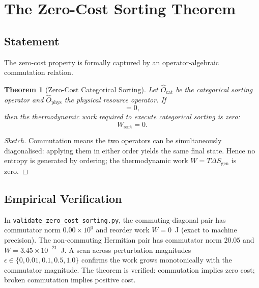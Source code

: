 \documentclass[twocolumn,11pt,a4paper]{article}
\newtheorem{theorem}{Theorem}[section]
\newcommand{\Ocat}{\hat{O}_{\mathrm{cat}}}
\newcommand{\Ophys}{\hat{O}_{\mathrm{phys}}}
\begin{document}
\section{The Zero-Cost Sorting Theorem}
\label{sec:zero_cost}

\subsection{Statement}

The zero-cost property is formally captured by an operator-algebraic commutation relation.

\begin{theorem}[Zero-Cost Categorical Sorting]
\label{thm:zero_cost}
Let $\Ocat$ be the categorical sorting operator and $\Ophys$ the physical resource operator. If
\begin{equation}
[\Ocat, \Ophys] = 0,
\end{equation}
then the thermodynamic work required to execute categorical sorting is zero:
\begin{equation}
W_{\text{sort}} = 0.
\end{equation}
\end{theorem}

\begin{proof}[Sketch]
Commutation means the two operators can be simultaneously diagonalised: applying them in either order yields the same final state. Hence no entropy is generated by ordering; the thermodynamic work $W = T \Delta S_{\text{gen}}$ is zero.
\end{proof}

\subsection{Empirical Verification}

In \texttt{validate\_zero\_cost\_sorting.py}, the commuting-diagonal pair has commutator norm $0.00 \times 10^0$ and reorder work $W = 0$~J (exact to machine precision). The non-commuting Hermitian pair has commutator norm $20.05$ and $W = 3.45 \times 10^{-21}$~J. A scan across perturbation magnitudes $\epsilon \in \{0, 0.01, 0.1, 0.5, 1.0\}$ confirms the work grows monotonically with the commutator magnitude. The theorem is verified: commutation implies zero cost; broken commutation implies positive cost.
\end{document}
